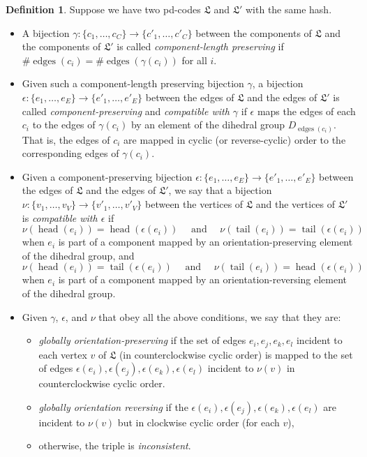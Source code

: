 \documentclass[amsmath,secnumarabic,floatfix,amssymb,nofootinbib,nobibnotes,letterpaper,11pt,tightenlines,showkeys]{revtex4}
\theoremstyle{definition}
\newtheorem{definition}[theorem]{Definition}
\newcommand{\edges}{\operatorname{edges}}
\newcommand{\head}{\operatorname{head}}
\newcommand{\tail}{\operatorname{tail}}
\let\mgp=\marginpar \marginparwidth18mm \marginparsep1mm
\def\marginpar#1{\mgp{\raggedright\tiny #1}}
\let\lbl=\label
\def\label#1{\lbl{#1}\ifinner\else\marginpar{\ref{#1} #1}\ignorespaces\fi}
\begin{document}
\begin{definition}
Suppose we have two pd-codes $\mathfrak{L}$ and $\mathfrak{L}'$ with the same hash.
\begin{itemize}
\item A bijection $\gamma: \{c_1,\dots,c_C\} \rightarrow \{c'_1,\dots,c'_C\}$ between the components of $\mathfrak{L}$ and the components of $\mathfrak{L}'$ is called \emph{component-length preserving} if $\# \edges(c_i) = \# \edges(\gamma(c_i))$ for all $i$.
\item Given such a component-length preserving bijection $\gamma$, a bijection $\epsilon : \{e_1,\dots,e_E\} \rightarrow \{e'_1,\dots,e'_E\}$ between the edges of $\mathfrak{L}$ and the edges of $\mathfrak{L}'$ is called \emph{component-preserving} and \emph{compatible with $\gamma$} if $\epsilon$ maps the edges of each $c_i$ to the edges of $\gamma(c_i)$ by an element of the dihedral group $D_{\edges(c_i)}$. That is, the edges of $c_i$ are mapped in cyclic (or reverse-cyclic) order to the corresponding edges of $\gamma(c_i)$.
\item Given a component-preserving bijection $\epsilon : \{e_1,\dots,e_E\} \rightarrow \{e'_1,\dots,e'_E\}$ between the edges of $\mathfrak{L}$ and the edges of $\mathfrak{L}'$, we say that a bijection $\nu : \{v_1, \dots, v_V\} \rightarrow \{v'_1,\dots,v'_V\}$ between the vertices of $\mathfrak{L}$ and the vertices of $\mathfrak{L}'$ is \emph{compatible with $\epsilon$} if
\begin{equation*}
\nu(\head(e_i)) = \head(\epsilon(e_i)) \quad \text{ and } \quad \nu(\tail(e_i)) = \tail(\epsilon(e_i))
\end{equation*}
when $e_i$ is part of a component mapped by an orientation-preserving element of the dihedral group, and
\begin{equation*}
\nu(\head(e_i)) = \tail(\epsilon(e_i)) \quad \text{ and } \quad \nu(\tail(e_i)) = \head(\epsilon(e_i))
\end{equation*}
when $e_i$ is part of a component mapped by an orientation-reversing element of the dihedral group.
\item Given $\gamma$, $\epsilon$, and $\nu$ that obey all the above conditions, we say that they are:
\begin{itemize}
 \item \emph{globally orientation-preserving} if the set of edges $e_i, e_j, e_k, e_l$ incident to each vertex $v$ of $\mathfrak{L}$ (in counterclockwise cyclic order) is mapped to the set of edges $\epsilon(e_i), \epsilon(e_j), \epsilon(e_k), \epsilon(e_l)$ incident to $\nu(v)$ in counterclockwise cyclic order.
 \item \emph{globally orientation reversing} if the $\epsilon(e_i), \epsilon(e_j), \epsilon(e_k), \epsilon(e_l)$ are incident to $\nu(v)$ but in clockwise cyclic order (for each $v$),
 \item otherwise, the triple is \emph{inconsistent}.
\end{itemize}
\end{itemize}
\label{def:compatible}
\end{definition}
\end{document}
